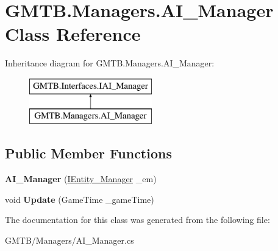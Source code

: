 \hypertarget{class_g_m_t_b_1_1_managers_1_1_a_i___manager}{}\section{G\+M\+T\+B.\+Managers.\+A\+I\+\_\+\+Manager Class Reference}
\label{class_g_m_t_b_1_1_managers_1_1_a_i___manager}
Inheritance diagram for G\+M\+T\+B.\+Managers.\+A\+I\+\_\+\+Manager\+:\begin{figure}[H]
\begin{center}
\leavevmode
\includegraphics[height=2.000000cm]{class_g_m_t_b_1_1_managers_1_1_a_i___manager}
\end{center}
\end{figure}
\subsection*{Public Member Functions}
\begin{DoxyCompactItemize}
\item 
\mbox{\label{class_g_m_t_b_1_1_managers_1_1_a_i___manager_a4e308a04964e22ac3e0c6de6526c2677}} 
{\bfseries A\+I\+\_\+\+Manager} (\mbox{\hyperlink{interface_g_m_t_b_1_1_interfaces_1_1_i_entity___manager}{I\+Entity\+\_\+\+Manager}} \+\_\+em)
\item 
\mbox{\label{class_g_m_t_b_1_1_managers_1_1_a_i___manager_a1f649e07ab6739330bed0f35514dca40}} 
void {\bfseries Update} (Game\+Time \+\_\+game\+Time)
\end{DoxyCompactItemize}


The documentation for this class was generated from the following file\+:\begin{DoxyCompactItemize}
\item 
G\+M\+T\+B/\+Managers/A\+I\+\_\+\+Manager.\+cs\end{DoxyCompactItemize}
